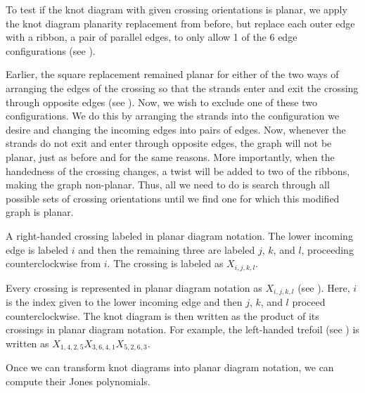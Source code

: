 \begin{paper}
To test if the knot diagram with given crossing orientations is planar, we
apply the knot diagram planarity replacement from before, but replace each outer
edge with a ribbon, a pair of parallel edges, to only allow 1 of the 6 edge
configurations (see \figRibbon).

Earlier, the square replacement remained planar for either of the two ways of
arranging the edges of the crossing so that the strands enter and exit the
crossing through opposite edges (see \figGraph).
Now, we wish to exclude one of these two configurations.
We do this by arranging the strands into the configuration we desire and
changing the incoming edges into pairs of edges.
Now, whenever the strands do not exit and enter through opposite edges, the
graph will not be planar, just as before and for the same reasons.
More importantly, when the handedness of the crossing changes, a twist will be
added to two of the ribbons, making the graph non-planar.
Thus, all we need to do is search through all possible sets of crossing
orientations until we find one for which this modified graph is planar.

{A right-handed crossing labeled in planar diagram notation.
The lower incoming edge is labeled $i$ and then the remaining three are labeled
$j$, $k$, and $l$, proceeding counterclockwise from $i$.
The crossing is labeled as $X_{i,j,k,l}$.}

Every crossing is represented in planar diagram notation as $X_{i,j,k,l}$ (see
\figX).
Here, $i$ is the index given to the lower incoming edge and then $j$, $k$, and
$l$ proceed counterclockwise.
The knot diagram is then written as the product of its crossings in planar
diagram notation.
For example, the left-handed trefoil (see \figLabeled) is written as
$X_{1,4,2,5}X_{3,6,4,1}X_{5,2,6,3}$.


Once we can transform knot diagrams into planar diagram notation, we can compute
their Jones polynomials.



\end{paper}
